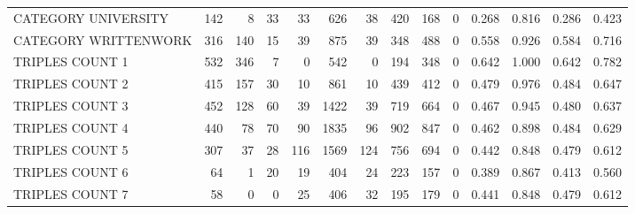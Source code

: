 \begin{tabular}{lrrrrrrrrrllll}
 CATEGORY UNIVERSITY      &             142 &             8 &              33 &              33 &             626 &   38 &  420 &  168 &    0 & 0.268 & 0.816 & 0.286 & 0.423 \\
 CATEGORY WRITTENWORK     &             316 &           140 &              15 &              39 &             875 &   39 &  348 &  488 &    0 & 0.558 & 0.926 & 0.584 & 0.716 \\
 TRIPLES COUNT 1          &             532 &           346 &               7 &               0 &             542 &    0 &  194 &  348 &    0 & 0.642 & 1.000 & 0.642 & 0.782 \\
 TRIPLES COUNT 2          &             415 &           157 &              30 &              10 &             861 &   10 &  439 &  412 &    0 & 0.479 & 0.976 & 0.484 & 0.647 \\
 TRIPLES COUNT 3          &             452 &           128 &              60 &              39 &            1422 &   39 &  719 &  664 &    0 & 0.467 & 0.945 & 0.480 & 0.637 \\
 TRIPLES COUNT 4          &             440 &            78 &              70 &              90 &            1835 &   96 &  902 &  847 &    0 & 0.462 & 0.898 & 0.484 & 0.629 \\
 TRIPLES COUNT 5          &             307 &            37 &              28 &             116 &            1569 &  124 &  756 &  694 &    0 & 0.442 & 0.848 & 0.479 & 0.612 \\
 TRIPLES COUNT 6          &              64 &             1 &              20 &              19 &             404 &   24 &  223 &  157 &    0 & 0.389 & 0.867 & 0.413 & 0.560 \\
 TRIPLES COUNT 7          &              58 &             0 &               0 &              25 &             406 &   32 &  195 &  179 &    0 & 0.441 & 0.848 & 0.479 & 0.612 \\
\hline
\end{tabular}